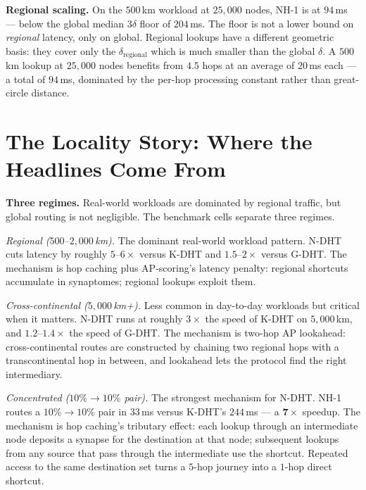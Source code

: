 \documentclass[twoside,nobib]{tufte-book}
\newcommand{\NDHT}{N-DHT\xspace}
\newcommand{\KDHT}{K-DHT\xspace}
\newcommand{\GDHT}{G-DHT\xspace}
\begin{document}
\textbf{Regional scaling.} On the $500$\,km workload at
$25{,}000$ nodes, NH-1 is at $94$\,ms --- below the global
median 3$\delta$ floor of $204$\,ms. The floor is not a lower
bound on \emph{regional} latency, only on global. Regional
lookups have a different geometric basis: they cover only the
$\delta_{\mathrm{regional}}$ which is much smaller than the
global $\delta$. A $500$\,km lookup at $25{,}000$ nodes
benefits from $4.5$ hops at an average of $20$\,ms each --- a
total of $94$\,ms, dominated by the per-hop processing
constant rather than great-circle distance.

\section{The Locality Story: Where the Headlines Come From}

\textbf{Three regimes.} Real-world workloads are dominated by
regional traffic, but global routing is not negligible. The
benchmark cells separate three regimes.

\emph{Regional ($500$--$2{,}000$\,km).} The dominant real-world
workload pattern. \NDHT cuts latency by roughly $5$--$6\times$
versus \KDHT and $1.5$--$2\times$ versus \GDHT. The mechanism
is hop caching plus AP-scoring's latency penalty: regional
shortcuts accumulate in synaptomes; regional lookups exploit
them.

\emph{Cross-continental ($5{,}000$\,km+).} Less common in
day-to-day workloads but critical when it matters. \NDHT runs
at roughly $3\times$ the speed of \KDHT on $5{,}000$\,km, and
$1.2$--$1.4\times$ the speed of \GDHT. The mechanism is
two-hop AP lookahead: cross-continental routes are constructed
by chaining two regional hops with a transcontinental hop in
between, and lookahead lets the protocol find the right
intermediary.

\emph{Concentrated ($10\% \to 10\%$ pair).} The strongest
mechanism for \NDHT. NH-1 routes a $10\% \to 10\%$ pair in $33$\,ms
versus \KDHT's $244$\,ms --- a $\mathbf{7\times}$ speedup. The
mechanism is hop caching's tributary effect: each lookup
through an intermediate node deposits a synapse for the
destination at that node; subsequent lookups from any source
that pass through the intermediate use the shortcut.
Repeated access to the same destination set turns a $5$-hop
journey into a $1$-hop direct shortcut.
\end{document}
